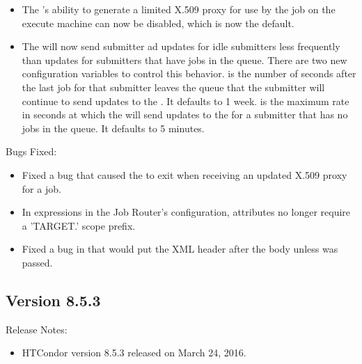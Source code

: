 \begin{itemize}
\item The 's ability to generate a limited X.509 proxy
for use by the job on the execute machine can now be disabled, which is now
the default.

\item The  will now send submitter ad updates for idle submitters
less frequently than updates for submitters that have jobs in the queue. There
are two new configuration variables to control this behavior.
 is the number of seconds after the last
job for that submitter leaves the queue that the submitter will continue to
send updates to the .  It defaults to 1 week.
 is the maximum rate in seconds at which
the  will send updates to the  for a submitter
that has no jobs in the queue. It defaults to 5 minutes. 

\end{itemize}

\noindent Bugs Fixed:

\begin{itemize}

\item Fixed a bug that caused the  to exit when receiving
an updated X.509 proxy for a job.

\item In expressions in the Job Router's configuration, attributes no
longer require a 'TARGET.' scope prefix.

\item Fixed a bug in   that would put the XML header
after the body unless  was passed.

\end{itemize}

\subsection*{\label{sec:New-8-5-3}Version 8.5.3}

\noindent Release Notes:

\begin{itemize}

\item HTCondor version 8.5.3 released on March 24, 2016.

\end{itemize}

